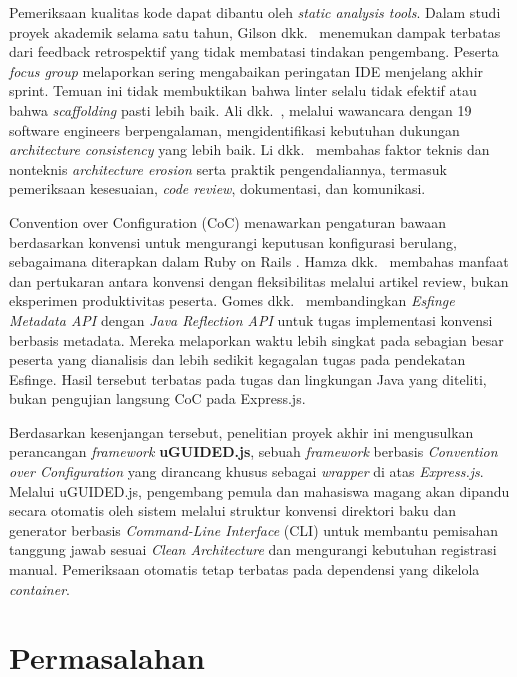 \documentclass[12pt,a4paper,oneside]{report}
\begin{document}
Pemeriksaan kualitas kode dapat dibantu oleh \textit{static analysis tools}. Dalam studi proyek akademik selama satu tahun, Gilson dkk.\ \cite{gilson2020junior} menemukan dampak terbatas dari feedback retrospektif yang tidak membatasi tindakan pengembang. Peserta \textit{focus group} melaporkan sering mengabaikan peringatan IDE menjelang akhir sprint. Temuan ini tidak membuktikan bahwa linter selalu tidak efektif atau bahwa \textit{scaffolding} pasti lebih baik. Ali dkk.\ \cite{ali2017architecture}, melalui wawancara dengan 19 software engineers berpengalaman, mengidentifikasi kebutuhan dukungan \textit{architecture consistency} yang lebih baik. Li dkk.\ \cite{strasser2021understanding} membahas faktor teknis dan nonteknis \textit{architecture erosion} serta praktik pengendaliannya, termasuk pemeriksaan kesesuaian, \textit{code review}, dokumentasi, dan komunikasi.

Convention over Configuration (CoC) menawarkan pengaturan bawaan berdasarkan konvensi untuk mengurangi keputusan konfigurasi berulang, sebagaimana diterapkan dalam Ruby on Rails \cite{hansson2011agile}. Hamza dkk.\ \cite{ijres2023coc} membahas manfaat dan pertukaran antara konvensi dengan fleksibilitas melalui artikel review, bukan eksperimen produktivitas peserta. Gomes dkk.\ \cite{esfinge2025coc} membandingkan \textit{Esfinge Metadata API} dengan \textit{Java Reflection API} untuk tugas implementasi konvensi berbasis metadata. Mereka melaporkan waktu lebih singkat pada sebagian besar peserta yang dianalisis dan lebih sedikit kegagalan tugas pada pendekatan Esfinge. Hasil tersebut terbatas pada tugas dan lingkungan Java yang diteliti, bukan pengujian langsung CoC pada Express.js.

Berdasarkan kesenjangan tersebut, penelitian proyek akhir ini mengusulkan perancangan \textit{framework} \textbf{uGUIDED.js}, sebuah \textit{framework} berbasis \textit{Convention over Configuration} yang dirancang khusus sebagai \textit{wrapper} di atas \textit{Express.js}. Melalui uGUIDED.js, pengembang pemula dan mahasiswa magang akan dipandu secara otomatis oleh sistem melalui struktur konvensi direktori baku dan generator berbasis \textit{Command-Line Interface} (CLI) untuk membantu pemisahan tanggung jawab sesuai \textit{Clean Architecture} dan mengurangi kebutuhan registrasi manual. Pemeriksaan otomatis tetap terbatas pada dependensi yang dikelola \textit{container}.

\section{Permasalahan}
\label{sec:permasalahan}
\end{document}
